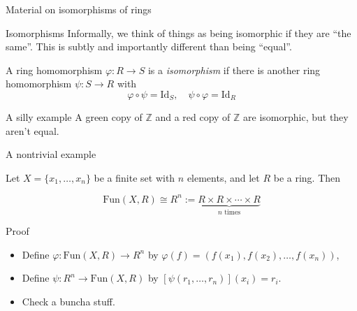 \documentclass{beamer}
\newcommand{\Z}{\mathbb{Z}}
\begin{document}
\begin{frame}[plain,c]

\begin{center}

\Huge

Material on isomorphisms of rings
\end{center}

\end{frame}



\begin{frame}{Isomorphisms}
Informally, we think of things as being isomorphic if they are ``the same''.  This is subtly and importantly different than being ``equal''.  

\begin{definition}
A ring homomorphism $\varphi:R\to S$ is a \emph{isomorphism} if there is another ring homomorphism $\psi:S\to R$ with $$\varphi\circ\psi=\text{Id}_S, \quad\psi\circ\varphi=\text{Id}_R$$
  \end{definition} 

\begin{block}{A silly example}
A green copy of $\Z$ and a red copy of $\Z$ are isomorphic, but they aren't equal.
\end{block}

\end{frame}

\begin{frame}{A nontrivial example}
  \begin{lemma} Let $X=\{x_1,\dots, x_n\}$ be a finite set with $n$ elements, and let $R$ be a ring.  Then

    $$\text{Fun}(X,R)\cong R^n:=\underbrace{R\times R\times\cdots\times R}_{\text{$n$ times}}$$
    \end{lemma}
  \begin{block}{Proof}
    \begin{itemize}
\item    Define $\varphi:\text{Fun}(X,R)\to R^n$ by $\varphi(f)=(f(x_1),f(x_2),\dots, f(x_n))$,
\item    Define $\psi:R^n\to\text{Fun}(X,R)$ by $[\psi(r_1,\dots, r_n)](x_i)=r_i$.
\item Check a buncha stuff.
    \end{itemize}
   \end{block}
 
\end{frame}
\end{document}
